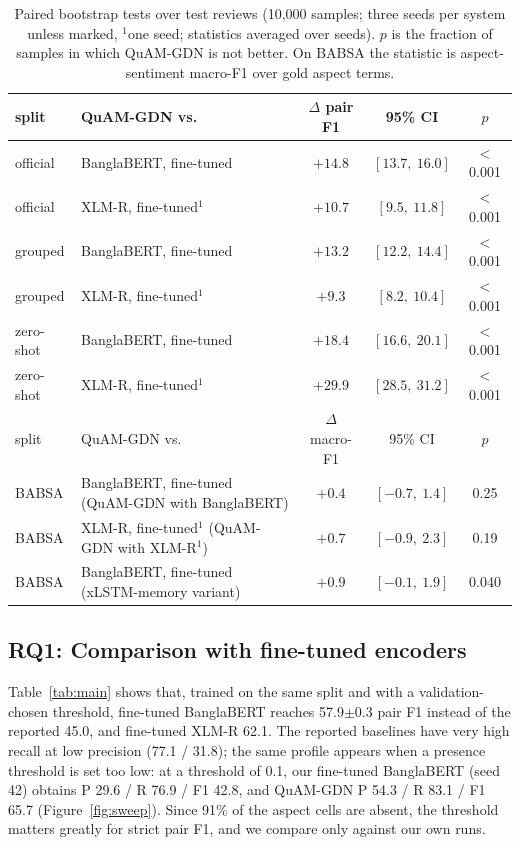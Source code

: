 \documentclass[11pt]{article}
\newcommand{\pmstd}[2]{#1{\scriptsize$\pm$#2}}
\newcommand{\quam}{QuAM-GDN}
\begin{document}
\begin{table}[t]
\centering\small
\begin{tabular}{llccc}
\toprule
split & \quam{} vs. & $\Delta$ pair F1 & 95\% CI & $p$ \\
\midrule
official  & BanglaBERT, fine-tuned & $+14.8$ & $[13.7,\ 16.0]$ & $<$0.001 \\
official  & XLM-R, fine-tuned$^1$  & $+10.7$ & $[9.5,\ 11.8]$  & $<$0.001 \\
grouped   & BanglaBERT, fine-tuned & $+13.2$ & $[12.2,\ 14.4]$ & $<$0.001 \\
grouped   & XLM-R, fine-tuned$^1$  & $+9.3$  & $[8.2,\ 10.4]$  & $<$0.001 \\
zero-shot & BanglaBERT, fine-tuned & $+18.4$ & $[16.6,\ 20.1]$ & $<$0.001 \\
zero-shot & XLM-R, fine-tuned$^1$  & $+29.9$ & $[28.5,\ 31.2]$ & $<$0.001 \\
\midrule
split & \quam{} vs. & $\Delta$ macro-F1 & 95\% CI & $p$ \\
\midrule
BABSA & BanglaBERT, fine-tuned (\quam{} with BanglaBERT) & $+0.4$ & $[-0.7,\ 1.4]$ & 0.25 \\
BABSA & XLM-R, fine-tuned$^1$ (\quam{} with XLM-R$^1$)  & $+0.7$ & $[-0.9,\ 2.3]$ & 0.19 \\
BABSA & BanglaBERT, fine-tuned (xLSTM-memory variant) & $+0.9$ & $[-0.1,\ 1.9]$ & 0.040 \\
\bottomrule
\end{tabular}
\caption{Paired bootstrap tests over test reviews (10,000 samples; three seeds per system unless
marked, $^1$one seed; statistics averaged over seeds). $p$ is the fraction of samples in which \quam{}
is not better. On BABSA the statistic is aspect-sentiment macro-F1 over gold aspect terms.}
\label{tab:sig}
\end{table}

\subsection{RQ1: Comparison with fine-tuned encoders}
Table~\ref{tab:main} shows that, trained on the same split and with a validation-chosen threshold,
fine-tuned BanglaBERT reaches \pmstd{57.9}{0.3} pair F1 instead of the reported 45.0, and fine-tuned
XLM-R 62.1. The reported baselines have very high recall at low precision (77.1 / 31.8); the same
profile appears when a presence threshold is set too low: at a threshold of 0.1, our fine-tuned
BanglaBERT (seed 42) obtains P 29.6 / R 76.9 / F1 42.8, and \quam{} P 54.3 / R 83.1 / F1 65.7
(Figure~\ref{fig:sweep}). Since 91\% of the aspect cells are absent, the threshold matters greatly for
strict pair F1, and we compare only against our own runs.
\end{document}
